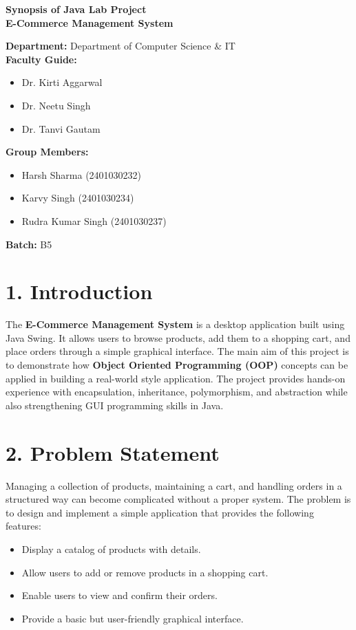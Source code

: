 \documentclass[12pt,a4paper]{article}
\begin{document}
\begin{center}
    \Large \textbf{Synopsis of Java Lab Project} \\
    \vspace{0.5cm}
    \large \textbf{E-Commerce Management System} \\
    \vspace{0.5cm}
\end{center}

\noindent
\textbf{Department:} Department of Computer Science \& IT \\
\textbf{Faculty Guide:} 
\begin{itemize}[nosep,left=0pt]
    \item Dr. Kirti Aggarwal
    \item Dr. Neetu Singh
    \item Dr. Tanvi Gautam
\end{itemize}

\noindent
\textbf{Group Members:}
\begin{itemize}[nosep,left=0pt]
    \item Harsh Sharma (2401030232)
    \item Karvy Singh (2401030234)
    \item Rudra Kumar Singh (2401030237)
\end{itemize}

\noindent
\textbf{Batch:} B5

\vspace{0.5cm}

\section*{1. Introduction}
The \textbf{E-Commerce Management System} is a desktop application built using Java Swing. It allows users to browse products, add them to a shopping cart, and place orders through a simple graphical interface. The main aim of this project is to demonstrate how \textbf{Object Oriented Programming (OOP)} concepts can be applied in building a real-world style application. The project provides hands-on experience with encapsulation, inheritance, polymorphism, and abstraction while also strengthening GUI programming skills in Java.

\section*{2. Problem Statement}
Managing a collection of products, maintaining a cart, and handling orders in a structured way can become complicated without a proper system. The problem is to design and implement a simple application that provides the following features:
\begin{itemize}[nosep]
    \item Display a catalog of products with details.
    \item Allow users to add or remove products in a shopping cart.
    \item Enable users to view and confirm their orders.
    \item Provide a basic but user-friendly graphical interface.
\end{itemize}
\end{document}
